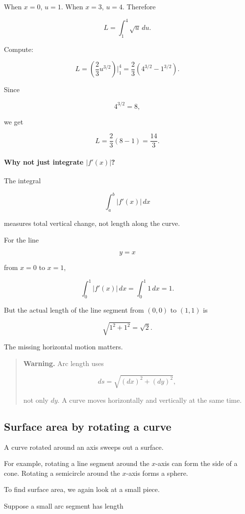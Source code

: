 When \(x=0\), \(u=1\).  When \(x=3\), \(u=4\).  Therefore

\[
L=\int_1^4 \sqrt{u}\,du.
\]

Compute:

\[
L=\left(\frac23u^{3/2}\right)\Big|_1^4
=
\frac23\left(4^{3/2}-1^{3/2}\right).
\]

Since

\[
4^{3/2}=8,
\]

we get

\[
L=\frac23(8-1)=\boxed{\frac{14}{3}}.
\]

\paragraph{Why not just integrate \(|f'(x)|\)?}
The integral

\[
\int_a^b |f'(x)|\,dx
\]

measures total vertical change, not length along the curve.

For the line

\[
y=x
\]

from \(x=0\) to \(x=1\),

\[
\int_0^1 |f'(x)|\,dx
=
\int_0^1 1\,dx
=
1.
\]

But the actual length of the line segment from \((0,0)\) to \((1,1)\) is

\[
\sqrt{1^2+1^2}=\sqrt2.
\]

The missing horizontal motion matters.

\begin{quote}
\textbf{Warning.}
Arc length uses

\[
ds=\sqrt{(dx)^2+(dy)^2},
\]

not only \(dy\).  A curve moves horizontally and vertically at the same time.
\end{quote}

\subsection{Surface area by rotating a curve}
\label{subsec:surface-area-rotating-curve}

A curve rotated around an axis sweeps out a surface.

For example, rotating a line segment around the \(x\)-axis can form the side of a cone.
Rotating a semicircle around the \(x\)-axis forms a sphere.

To find surface area, we again look at a small piece.

Suppose a small arc segment has length

